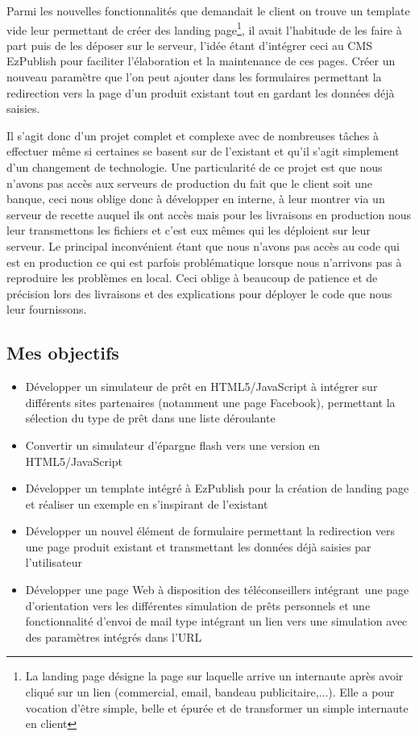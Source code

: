 \documentclass[a4paper,11pt,twoside]{report}
\begin{document}
    Parmi les nouvelles fonctionnalités que demandait le client on trouve un template vide leur permettant de créer des landing page\footnote{La landing page désigne la page sur laquelle arrive un internaute après avoir cliqué sur un lien (commercial, email, bandeau publicitaire,...). Elle a pour vocation d'être simple, belle et épurée et de transformer un simple internaute en client}, il avait l'habitude de les faire à part puis de les déposer sur le serveur, l'idée étant d'intégrer ceci au CMS EzPublish pour faciliter l'élaboration et la maintenance de ces pages. Créer un nouveau paramètre que l'on peut ajouter dans les formulaires permettant la redirection vers la page d'un produit existant tout en gardant les données déjà saisies. 
    
    Il s'agit donc d'un projet complet et complexe avec de nombreuses tâches à effectuer même si certaines se basent sur de l'existant et qu'il s'agit simplement d'un changement de technologie. Une particularité de ce projet est que nous n'avons pas accès aux serveurs de production du fait que le client soit une banque, ceci nous oblige donc à développer en interne, à leur montrer via un serveur de recette auquel ils ont accès mais pour les livraisons en production nous leur transmettons les fichiers et c'est eux mêmes qui les déploient sur leur serveur. Le principal inconvénient étant que nous n'avons pas accès au code qui est en production ce qui est parfois problématique lorsque nous n'arrivons pas à reproduire les problèmes en local. Ceci oblige à beaucoup de patience et de précision lors des livraisons et des explications pour déployer le code que nous leur fournissons.  
    \subsection*{Mes objectifs}
      \begin{itemize}

	\item Développer un simulateur de prêt en HTML5/JavaScript à intégrer sur différents sites partenaires (notamment une page Facebook), permettant la sélection du type de prêt dans une liste déroulante
	\item Convertir un simulateur d'épargne flash vers une version en HTML5/JavaScript 
	\item Développer un template intégré à EzPublish pour la création de landing page et réaliser un exemple en s'inspirant de l'existant
	\item Développer un nouvel élément de formulaire permettant la redirection vers une page produit existant et transmettant les données déjà saisies par l'utilisateur
 	\item Développer une page Web à disposition des téléconseillers intégrant une page d’orientation vers les différentes simulation de prêts personnels et une fonctionnalité d’envoi de mail type intégrant un lien vers une simulation avec des paramètres intégrés dans l’URL

      \end{itemize}
\end{document}
